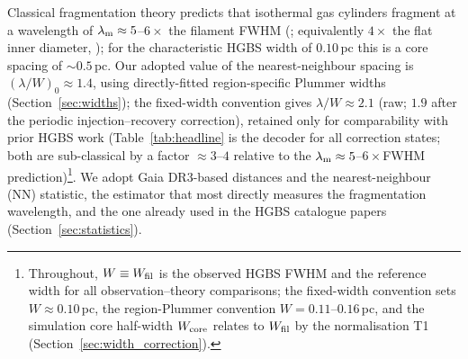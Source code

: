 \documentclass[usenatbib,twoside,twocolumn]{mnras}
\begin{document}
Classical fragmentation theory \citep{Inutsuka1992} predicts that isothermal gas cylinders fragment at a wavelength of $\lambda_{\rm m}\approx5$--$6\times$ the filament FWHM (\citealt{Fischera2012}; equivalently $4\times$ the flat inner diameter, \citealt{Inutsuka1992}); for the characteristic HGBS width of $0.10$\,pc this is a core spacing of $\sim0.5$\,pc. Our adopted value of the nearest-neighbour spacing is $(\lambda/W)_0\approx1.4$, using directly-fitted region-specific Plummer widths (Section~\ref{sec:widths}); the fixed-width convention gives $\lambda/W\approx2.1$ (raw; $1.9$ after the periodic injection--recovery correction), retained only for comparability with prior HGBS work (Table~\ref{tab:headline} is the decoder for all correction states; both are sub-classical by a factor $\approx3$--$4$ relative to the $\lambda_{\rm m}\approx5$--$6\times$FWHM prediction)\footnote{Throughout, $W\equiv W_{\rm fil}$ is the observed HGBS FWHM and the reference width for all observation--theory comparisons; the fixed-width convention sets $W\approx0.10$\,pc, the region-Plummer convention $W=0.11$--$0.16$\,pc, and the simulation core half-width $W_{\rm core}$ relates to $W_{\rm fil}$ by the normalisation T1 (Section~\ref{sec:width_correction}).}. We adopt Gaia DR3-based distances \citep{Zhang2023} and the nearest-neighbour (NN) statistic, the estimator that most directly measures the fragmentation wavelength, and the one already used in the HGBS catalogue papers \citep{Konyves2015,Konyves2020} (Section~\ref{sec:statistics}).
\end{document}
